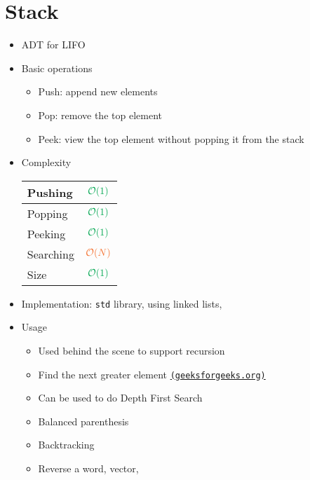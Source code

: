 \section{Stack}

\begin{itemize}
	\item \ac{ADT} for \ac{LIFO}
	\item Basic operations
	\begin{itemize}
		\item Push: append new elements
		\item Pop: remove the top element
		\item Peek: view the top element without popping it from the stack
	\end{itemize}
	\item Complexity
	\begin{center}
		\begin{tabular}{|l|c|}
			\hline
			Pushing & $ \color{Green} \mathcal{O}(1) $ \\ \hline
			Popping & $ \color{Green} \mathcal{O}(1) $ \\ \hline
			Peeking & $ \color{Green} \mathcal{O}(1) $ \\ \hline
			Searching & $ \color{Orange} \mathcal{O}(N) $ \\ \hline
			Size & $ \color{Green} \mathcal{O}(1) $ \\ \hline
		\end{tabular}
	\end{center}
	\item Implementation: \texttt{std} library, using linked lists, \etc
	\item Usage
	\begin{itemize}
		\item Used behind the scene to support recursion
		\item Find the next greater element \href{https://www.geeksforgeeks.org/next-greater-element/}{\texttt{(geeksforgeeks.org)}}
		\item Can be used to do Depth First Search
		\item Balanced parenthesis
		\item Backtracking
		\item Reverse a word, vector, \etc
	\end{itemize}
\end{itemize}

